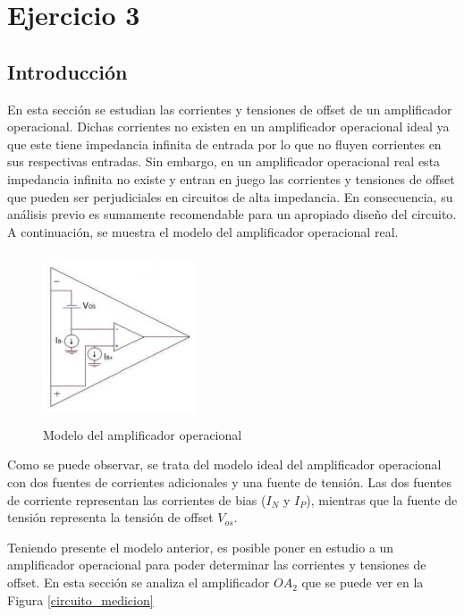 \documentclass[12pt,a4paper]{article}
\begin{document}
\section{Ejercicio 3}
\subsection{Introducción}

En esta sección se estudian las corrientes y tensiones de offset de un amplificador operacional. Dichas corrientes no existen en un amplificador operacional
ideal ya que este tiene impedancia infinita de entrada por lo que no fluyen corrientes en sus respectivas entradas. Sin embargo, en un amplificador operacional real 
esta impedancia infinita no existe y entran en juego las corrientes y tensiones de offset que pueden ser perjudiciales en circuitos de alta impedancia. En consecuencia, su análisis previo es sumamente recomendable para un apropiado diseño del
circuito. A continuación, se muestra el modelo del amplificador operacional real.

\begin{figure}[ht]                                                       
    \centering\includegraphics[width=0.4\textwidth, height=5cm]{Figuras/fig_0.png}
     \caption{Modelo del amplificador operacional}
     \label{fig_0}
     \end{figure}



Como se puede observar, se trata del modelo ideal del amplificador operacional con dos fuentes de corrientes adicionales y una fuente de tensión.
Las dos fuentes de corriente representan las corrientes de bias ($I_N$ y $I_P$), mientras que la fuente de tensión representa la tensión de offset $V_{os}$.

Teniendo presente el modelo anterior, es posible poner en estudio a un amplificador operacional para poder determinar las corrientes y tensiones de offset. En esta sección se analiza el
amplificador $OA_2$ que se puede ver en la Figura \ref{circuito_medicion}
\end{document}
